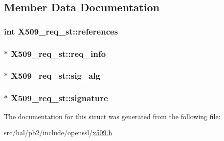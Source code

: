 \subsection{Member Data Documentation}
\subsubsection[{\texorpdfstring{references}{references}}]{\setlength{\rightskip}{0pt plus 5cm}int X509\+\_\+req\+\_\+st\+::references}\hypertarget{struct_x509__req__st_a4c2c07b36957fd3bb1ec804265a0184d}{}\label{struct_x509__req__st_a4c2c07b36957fd3bb1ec804265a0184d}
\subsubsection[{\texorpdfstring{req\+\_\+info}{req_info}}]{$\ast$ X509\+\_\+req\+\_\+st\+::req\+\_\+info}\hypertarget{struct_x509__req__st_acabf08f567bc1a05244378f6b9ce4ce0}{}\label{struct_x509__req__st_acabf08f567bc1a05244378f6b9ce4ce0}
\subsubsection[{\texorpdfstring{sig\+\_\+alg}{sig_alg}}]{$\ast$ X509\+\_\+req\+\_\+st\+::sig\+\_\+alg}\hypertarget{struct_x509__req__st_aece99c32f3a4dfaae643110bf2f8a8f6}{}\label{struct_x509__req__st_aece99c32f3a4dfaae643110bf2f8a8f6}
\subsubsection[{\texorpdfstring{signature}{signature}}]{$\ast$ X509\+\_\+req\+\_\+st\+::signature}\hypertarget{struct_x509__req__st_a43ddd2fab56363b07b095e6f1a6d43d1}{}\label{struct_x509__req__st_a43ddd2fab56363b07b095e6f1a6d43d1}


The documentation for this struct was generated from the following file\+:\begin{DoxyCompactItemize}
\item 
src/hal/pb2/include/openssl/\hyperlink{x509_8h}{x509.\+h}\end{DoxyCompactItemize}
